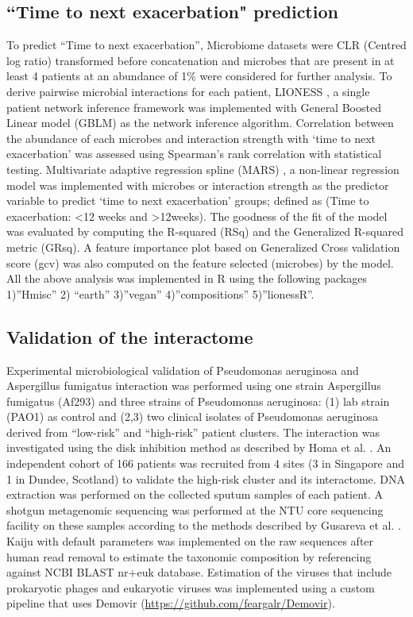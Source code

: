 \subsection{``Time to next exacerbation" prediction}

To predict “Time to next exacerbation”, Microbiome datasets were CLR (Centred log ratio) transformed before concatenation and microbes that are present in at least 4 patients at an abundance of 1\% were considered for further analysis. To derive pairwise microbial interactions for each patient, LIONESS \cite{Kuijjer2019}, a single patient network inference framework was implemented with General Boosted Linear model (GBLM) as the network inference algorithm. Correlation between the abundance of each microbes and interaction strength with ‘time to next exacerbation’ was assessed using Spearman’s rank correlation with statistical testing. Multivariate adaptive regression spline (MARS) \cite{Friedman1991}, a non-linear regression model was implemented with microbes or interaction strength as the predictor variable to predict ‘time to next exacerbation’ groups; defined as (Time to exacerbation: <12 weeks and >12weeks). The goodness of the fit of the model was evaluated by computing the R-squared (RSq) and the Generalized R-squared metric (GRsq). A feature importance plot based on Generalized Cross validation score (gcv) was also computed on the feature selected (microbes) by the model.  All the above analysis was implemented in R using the following packages 1)”Hmisc” 2) “earth” 3)”vegan” 4)”compositions” 5)”lionessR”.

\subsection{Validation of the interactome}

Experimental microbiological validation of Pseudomonas aeruginosa and Aspergillus fumigatus interaction was performed using one strain Aspergillus fumigatus (Af293) and three strains of Pseudomonas aeruginosa: (1) lab strain (PAO1) as control and (2,3) two clinical isolates of Pseudomonas aeruginosa derived from “low-risk” and “high-risk” patient clusters. The interaction was investigated using the disk inhibition method as described by Homa et al. \cite{Homa2019}.
An independent cohort of 166 patients was recruited from 4 sites (3 in Singapore and 1 in Dundee, Scotland) to validate the high-risk cluster and its interactome. DNA extraction was performed on the collected sputum samples of each patient. A shotgun metagenomic sequencing was performed at the NTU core sequencing facility on these samples according to the methods described by Gusareva et al. \cite{Gusareva2019}. Kaiju \cite{Menzel2016} with default parameters was implemented on the raw sequences after human read removal to estimate the taxonomic composition by referencing against NCBI BLAST nr+euk database. Estimation of the viruses that include prokaryotic phages and eukaryotic viruses was implemented using a custom pipeline that uses Demovir (\url{https://github.com/feargalr/Demovir}).
